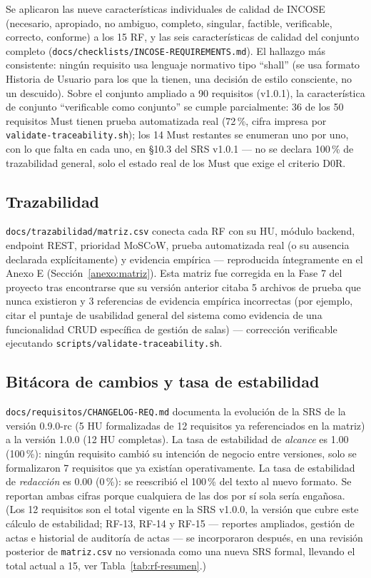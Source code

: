 Se aplicaron las nueve características individuales de calidad de INCOSE \cite{incose2023} (necesario,
apropiado, no ambiguo, completo, singular, factible, verificable, correcto, conforme) a los 15 RF, y las
seis características de calidad del conjunto completo (\texttt{docs/checklists/INCOSE-REQUIREMENTS.md}).
El hallazgo más consistente: ningún requisito usa lenguaje normativo tipo ``shall'' (se usa formato
Historia de Usuario para los que la tienen, una decisión de estilo consciente, no un descuido). Sobre el
conjunto ampliado a 90 requisitos (v1.0.1), la característica de conjunto ``verificable como conjunto''
se cumple parcialmente: 36 de los 50 requisitos Must tienen prueba automatizada real (72\,\%, cifra
impresa por \texttt{validate-traceability.sh}); los 14 Must restantes se enumeran uno por uno, con lo
que falta en cada uno, en \S10.3 del SRS v1.0.1 --- no se declara 100\,\% de trazabilidad general, solo
el estado real de los Must que exige el criterio D0R.

\subsection{Trazabilidad}

\texttt{docs/trazabilidad/matriz.csv} conecta cada RF con su HU, módulo backend, endpoint REST,
prioridad MoSCoW, prueba automatizada real (o su ausencia declarada explícitamente) y evidencia
empírica --- reproducida íntegramente en el Anexo E (Sección~\ref{anexo:matriz}). Esta matriz fue corregida en la Fase 7 del proyecto tras encontrarse que su versión anterior
citaba 5 archivos de prueba que nunca existieron y 3 referencias de evidencia empírica incorrectas (por
ejemplo, citar el puntaje de usabilidad general del sistema como evidencia de una funcionalidad CRUD
específica de gestión de salas) --- corrección verificable ejecutando
\texttt{scripts/validate-traceability.sh}.

\subsection{Bitácora de cambios y tasa de estabilidad}

\texttt{docs/requisitos/CHANGELOG-REQ.md} documenta la evolución de la SRS de la versión 0.9.0-rc (5 HU
formalizadas de 12 requisitos ya referenciados en la matriz) a la versión 1.0.0 (12 HU completas). La
tasa de estabilidad de \textit{alcance} es 1.00 (100\,\%): ningún requisito cambió su intención de
negocio entre versiones, solo se formalizaron 7 requisitos que ya existían operativamente. La tasa de
estabilidad de \textit{redacción} es 0.00 (0\,\%): se reescribió el 100\,\% del texto al nuevo formato.
Se reportan ambas cifras porque cualquiera de las dos por sí sola sería engañosa. (Los 12 requisitos son
el total vigente en la SRS v1.0.0, la versión que cubre este cálculo de estabilidad; RF-13, RF-14 y RF-15
--- reportes ampliados, gestión de actas e historial de auditoría de actas --- se incorporaron después,
en una revisión posterior de \texttt{matriz.csv} no versionada como una nueva SRS formal, llevando el
total actual a 15, ver Tabla~\ref{tab:rf-resumen}.)

